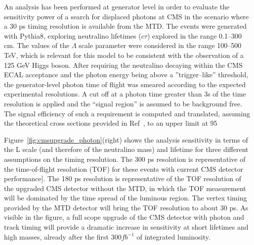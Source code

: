 An analysis has been performed at generator level in order to evaluate the sensitivity power of a
search for displaced photons at CMS in the scenario where a 30 ps timing resolution is available from the MTD. The events were generated with Pythia8, exploring neutralino lifetimes ($c\tau$) explored in the range 0.1–300 cm.
The values of the $\Lambda$ scale parameter were considered in the range 100–500 TeV, which is relevant for this model to be consistent with the observation of a 125 GeV Higgs boson.
After requiring the neutralino decaying within the CMS ECAL acceptance and the photon energy being above a ”trigger–like” threshold, the generator-level photon time of flight was smeared according to the expected experimental resolutions. A cut
off at a photon time greater than 3s of the time resolution is applied and the “signal region” is assumed to be background free. The signal efficiency of such a requirement is computed and translated, assuming the theoretical cross sections provided in Ref~\cite{ref:GMSB}, to an upper limit at 95%

Figure~\ref{fig:cmsupgrade_photon}(right) shows the analysis sensitivity in terms of the L scale (and therefore of the neutralino mass) and lifetime for three different assumptions on the timing resolution. 
The 300 ps resolution is representative of the time-of-flight resolution (TOF) for these events with current CMS detector performance]. 
The 180 ps resolution is representative of the TOF resolution of the upgraded CMS detector without the MTD, in which the TOF measurement will be dominated by the time spread of the luminous region. 
The vertex timing provided by the MTD detector will bring the TOF resolution to about 30 ps. 
As visible in the figure, a full scope upgrade of the CMS detector with photon and track timing will provide a dramatic increase in sensitivity at short lifetimes and high masses, already after the first $300 fb^{-1}$ of integrated luminosity.

